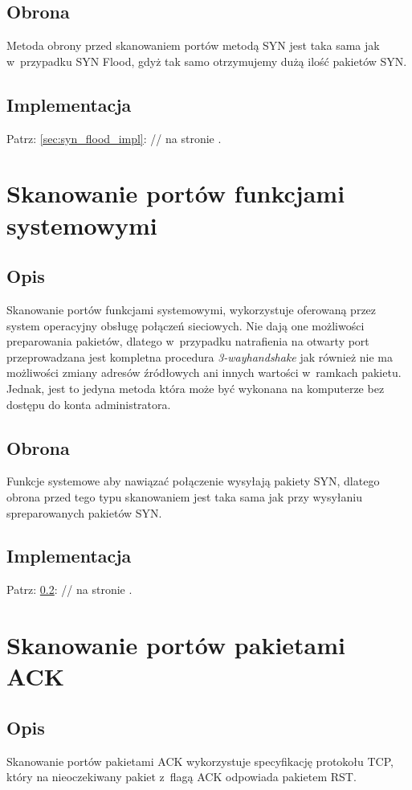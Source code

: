 \documentclass[a4paper,12pt,oneside]{book}
\begin{document}
		\subsection{Obrona}
			Metoda obrony przed skanowaniem portów metodą SYN jest taka sama jak w~przypadku SYN Flood, gdyż tak samo otrzymujemy dużą ilość pakietów SYN.
		\subsection{Implementacja}
			\label{sec:syn_scan_impl}
			Patrz: \ref{sec:syn_flood_impl}: // na stronie \pageref{sec:syn_flood_impl}.
	\section{Skanowanie portów funkcjami systemowymi}
		\subsection{Opis}
			Skanowanie portów funkcjami systemowymi, wykorzystuje oferowaną przez system operacyjny obsługę połączeń sieciowych.
			Nie dają one możliwości preparowania pakietów, dlatego w~przypadku natrafienia na otwarty port przeprowadzana jest kompletna procedura \textit{3-way\dywiz handshake} jak również nie ma możliwości zmiany adresów źródłowych ani innych wartości w~ramkach pakietu.
			Jednak, jest to jedyna metoda która może być wykonana na komputerze bez dostępu do konta administratora.
		\subsection{Obrona}
			Funkcje systemowe aby nawiązać połączenie wysyłają pakiety SYN, dlatego obrona przed tego typu skanowaniem jest taka sama jak przy wysyłaniu spreparowanych pakietów SYN.
		\subsection{Implementacja}
			Patrz: \ref{sec:syn_scan_impl}: // na stronie \pageref{sec:syn_scan_impl}.
	\section{Skanowanie portów pakietami ACK}
		\subsection{Opis}
			Skanowanie portów pakietami ACK wykorzystuje specyfikację protokołu TCP, który na nieoczekiwany pakiet z~flagą ACK odpowiada pakietem RST.
\end{document}
